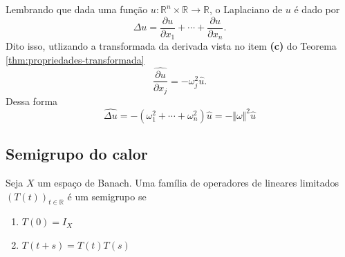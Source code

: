\documentclass[a4paper, 11pt]{book}
\theoremstyle{definition}
\newcommand{\bR}{\mathbb{R}}
\begin{document}
\begin{ex}
    Lembrando que dada uma função $u : \bR^n \times \bR \to \bR$, o Laplaciano de $u$ é dado por
    \[
        \Delta u = \frac{\partial u}{\partial x_1} + \cdots + \frac{\partial u}{\partial x_n}.
    \]
    Dito isso, utlizando a transformada da derivada vista no item \textbf{(c)} do Teorema \ref{thm:propriedades-transformada}
    \[
        \widehat{\frac{\partial u}{\partial x_j}} = -\omega_j^2 \hat u.
    \]
    Dessa forma
    \[
        \widehat{\Delta u} = -(\omega_1^2 + \cdots + \omega_n^2) \hat u = - \Vert \omega \Vert^2 \hat u
    \]
\end{ex}

\subsection{Semigrupo do calor}

\begin{dbox}
    Seja $X$ um espaço de Banach. Uma família de operadores de lineares limitados $(T(t))_{t\in\bR}$ é um semigrupo se
    \begin{enumerate}
        \item $T(0) = I_X$
        \item $T(t + s) = T(t)T(s)$
    \end{enumerate}
\end{dbox}
\end{document}
